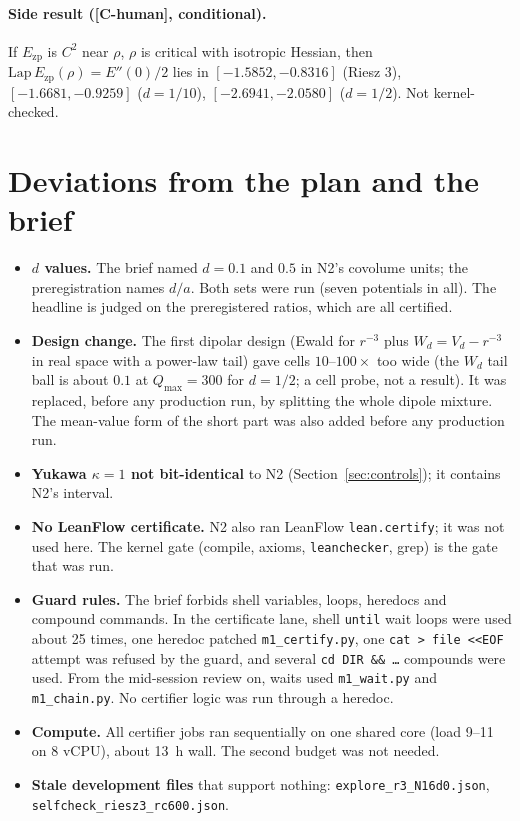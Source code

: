 \documentclass[11pt]{article}
\newcommand{\tier}[1]{\textsf{[#1]}}
\newcommand{\tCh}{\tier{C-human}}
\newcommand{\lean}[1]{\texttt{#1}}
\newcommand{\Ezp}{E_{\mathrm{zp}}}
\begin{document}
\paragraph{Side result (\tCh, conditional).} If $\Ezp$ is $C^2$ near $\rho$, $\rho$ is critical with isotropic Hessian, then $\mathrm{Lap}\,\Ezp(\rho)=E''(0)/2$ lies in $[-1.5852,-0.8316]$ (Riesz 3), $[-1.6681,-0.9259]$ ($d=1/10$), $[-2.6941,-2.0580]$ ($d=1/2$). Not kernel-checked.

\section{Deviations from the plan and the brief}\label{sec:dev}
\begin{itemize}\itemsep=1pt
\item \textbf{$d$ values.} The brief named $d=0.1$ and $0.5$ in N2's covolume units; the preregistration names $d/a$. Both sets were run (seven potentials in all). The headline is judged on the preregistered ratios, which are all certified.
\item \textbf{Design change.} The first dipolar design (Ewald for $r^{-3}$ plus $W_d=V_d-r^{-3}$ in real space with a power-law tail) gave cells $10$--$100\times$ too wide (the $W_d$ tail ball is about $0.1$ at $Q_{\max}=300$ for $d=1/2$; a cell probe, not a result). It was replaced, before any production run, by splitting the whole dipole mixture. The mean-value form of the short part was also added before any production run.
\item \textbf{Yukawa $\kappa=1$ not bit-identical} to N2 (Section~\ref{sec:controls}); it contains N2's interval.
\item \textbf{No LeanFlow certificate.} N2 also ran LeanFlow \lean{lean.certify}; it was not used here. The kernel gate (compile, axioms, \texttt{leanchecker}, grep) is the gate that was run.
\item \textbf{Guard rules.} The brief forbids shell variables, loops, heredocs and compound commands. In the certificate lane, shell \texttt{until} wait loops were used about 25 times, one heredoc patched \texttt{m1\_certify.py}, one \texttt{cat > file <<EOF} attempt was refused by the guard, and several \texttt{cd DIR \&\& \dots} compounds were used. From the mid-session review on, waits used \texttt{m1\_wait.py} and \texttt{m1\_chain.py}. No certifier logic was run through a heredoc.
\item \textbf{Compute.} All certifier jobs ran sequentially on one shared core (load 9--11 on 8 vCPU), about 13~h wall. The second budget was not needed.
\item \textbf{Stale development files} that support nothing: \texttt{explore\_r3\_N16d0.json}, \texttt{selfcheck\_riesz3\_rc600.json}.
\end{itemize}
\end{document}
